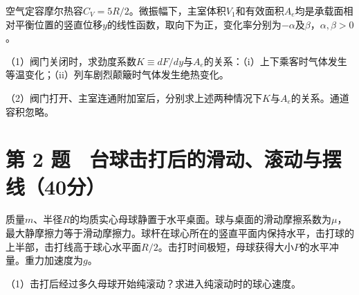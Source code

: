 \documentclass[12pt,a4paper,fontset=fandol]{ctexart}
\begin{document}
空气定容摩尔热容\(C_V=5R/2\)。微振幅下，主室体积\(V_1\)和有效面积\(A_e\)均是承载面相对平衡位置的竖直位移\(y\)的线性函数，取向下为正，变化率分别为\(-\alpha\)及\(\beta\)，\(\alpha,\beta>0\)。

（1）阀门关闭时，求劲度系数\(K\equiv dF/dy\)与\(A_e\)的关系：（i）上下乘客时气体发生等温变化；（ii）列车剧烈颠簸时气体发生绝热变化。

（2）阀门打开、主室连通附加室后，分别求上述两种情况下\(K\)与\(A_e\)的关系。通道容积忽略。

\clearpage

\section{第 2
题　台球击打后的滑动、滚动与摆线（40分）}\label{ux7b2c-2-ux9898-ux53f0ux7403ux51fbux6253ux540eux7684ux6ed1ux52a8ux6edaux52a8ux4e0eux6446ux7ebf40ux5206}

质量\(m\)、半径\(R\)的均质实心母球静置于水平桌面。球与桌面的滑动摩擦系数为\(\mu\)，最大静摩擦力等于滑动摩擦力。球杆在球心所在的竖直平面内保持水平，击打球的上半部，击打线高于球心水平面\(R/2\)。击打时间极短，母球获得大小\(P\)的水平冲量。重力加速度为\(g\)。

\begin{center}
\begin{minipage}{\linewidth}
\centering\begingroup{}
\ifdim\wd\diagrambox>.88\linewidth
\sbox{\diagrambox}{\resizebox{.88\linewidth}{!}{\usebox{\diagrambox}}}\fi
\ifdim\ht\diagrambox>.20\textheight
\resizebox{!}{.20\textheight}{\usebox{\diagrambox}}
\else\usebox{\diagrambox}\fi
\par{}\endgroup\end{minipage}\end{center}

（1）击打后经过多久母球开始纯滚动？求进入纯滚动时的球心速度。
\end{document}
